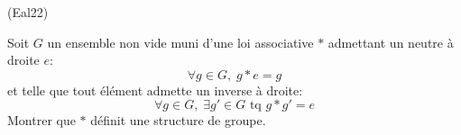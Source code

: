 \begin{tiny}(Eal22)\end{tiny} Soit $G$ un ensemble non vide muni d'une loi associative $*$ admettant un neutre à droite $e$:
\begin{displaymath}
  \forall g\in G,\; g*e = g
\end{displaymath}
et telle que tout élément admette un inverse à droite:
\begin{displaymath}
  \forall g\in G, \; \exists g'\in G \text{ tq } g*g' = e
\end{displaymath}
Montrer que $*$ définit une structure de groupe.